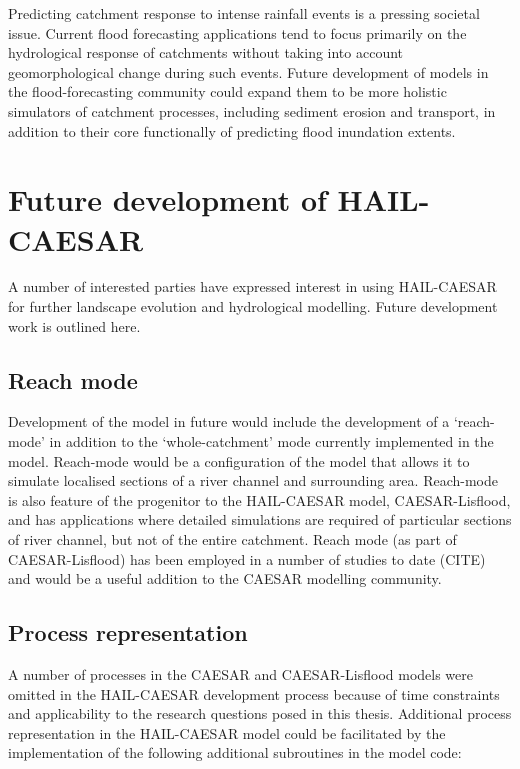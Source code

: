 Predicting catchment response to intense rainfall events is a pressing societal issue. Current flood forecasting applications tend to focus primarily on the hydrological response of catchments without taking into account geomorphological change during such events. Future development of models in the flood-forecasting community could expand them to be more holistic simulators of catchment processes, including sediment erosion and transport, in addition to their core functionally of predicting flood inundation extents. 

\section{Future development of HAIL-CAESAR}

A number of interested parties have expressed interest in using HAIL-CAESAR for further landscape evolution and hydrological modelling. Future development work is outlined here.

\subsection*{Reach mode}
Development of the model in future would include the development of a `reach-mode' in addition to the `whole-catchment' mode currently implemented in the model. Reach-mode would be a configuration of the model that allows it to simulate localised sections of a river channel and surrounding area. Reach-mode is also feature of the progenitor to the HAIL-CAESAR model, CAESAR-Lisflood, and has applications where detailed simulations are required of particular sections of river channel, but not of the entire catchment. Reach mode (as part of CAESAR-Lisflood) has been employed in a number of studies to date (CITE) and would be a useful addition to the CAESAR modelling community. 

\subsection*{Process representation}
A number of processes in the CAESAR and CAESAR-Lisflood models were omitted in the HAIL-CAESAR development process because of time constraints and applicability to the research questions posed in this thesis. Additional process representation in the HAIL-CAESAR model could be facilitated by the implementation of the following additional subroutines in the model code:

